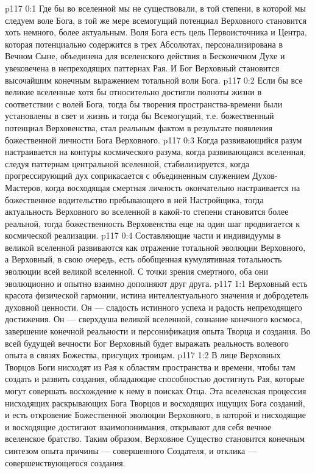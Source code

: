 \author{Могучий Вестник}
\vs p117 0:1 Где бы во вселенной мы не существовали, в той степени, в которой мы следуем воле Бога, в той же мере всемогущий потенциал Верховного становится хоть немного, более актуальным. Воля Бога есть цель Первоисточника и Центра, которая потенциально содержится в трех Абсолютах, персонализирована в Вечном Сыне, объединена для вселенского действия в Бесконечном Духе и увековечена в непреходящих паттернах Рая. И Бог Верховный становится высочайшим конечным выражением тотальной воли Бога.
\vs p117 0:2 Если бы все великие вселенные хотя бы относительно достигли полноты жизни в соответствии с волей Бога, тогда бы творения пространства\hyp{}времени были установлены в свет и жизнь и тогда бы Всемогущий, т.е. божественный потенциал Верховенства, стал реальным фактом в результате появления божественной личности Бога Верховного.
\vs p117 0:3 Когда развивающийся разум настраивается на контуры космического разума, когда развивающаяся вселенная, следуя паттернам центральной вселенной, стабилизируется, когда прогрессирующий дух соприкасается с объединенным служением Духов\hyp{}Мастеров, когда восходящая смертная личность окончательно настраивается на божественное водительство пребывающего в ней Настройщика, тогда актуальность Верховного во вселенной в какой\hyp{}то степени становится более реальной, тогда божественность Верховенства еще на один шаг продвигается к космической реализации.
\vs p117 0:4 Составляющие части и индивидуумы в великой вселенной развиваются как отражение тотальной эволюции Верховного, а Верховный, в свою очередь, есть обобщенная кумулятивная тотальность эволюции всей великой вселенной. С точки зрения смертного, оба они эволюционно и опытно взаимно дополняют друг друга.
\vs p117 1:1 Верховный есть красота физической гармонии, истина интеллектуального значения и добродетель духовной ценности. Он --- сладость истинного успеха и радость непреходящего достижения. Он --- сверхдуша великой вселенной, сознание конечного космоса, завершение конечной реальности и персонификация опыта Творца и создания. Во всей будущей вечности Бог Верховный будет выражать реальность волевого опыта в связях Божества, присущих троицам.
\vs p117 1:2 \pc В лице Верховных Творцов Боги нисходят из Рая к областям пространства и времени, чтобы там создать и развить создания, обладающие способностью достигнуть Рая, которые могут совершать восхождение к нему в поисках Отца. Эта вселенская процессия нисходящих раскрывающих Бога Творцов и восходящих ищущих Бога созданий, и есть откровение Божественной эволюции Верховного, в которой и нисходящие и восходящие достигают взаимопонимания, открывают для себя вечное вселенское братство. Таким образом, Верховное Существо становится конечным синтезом опыта причины --- совершенного Создателя, и отклика --- совершенствующегося создания.
